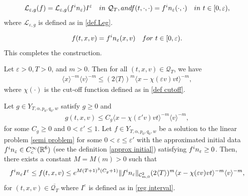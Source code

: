 \documentclass[10pt,a4paper]{amsart}
\begin{document}
\begin{align}\label{semi problem}
\mathcal{L}_{\varepsilon,g}(f) = \mathcal{L}_{\varepsilon,g}(f^\textup{in}_\varepsilon)I^\varepsilon \quad \textup{ in }\,\, \mathcal{Q}_T,\textup{ and }f(t,\cdot,\cdot) = f^\textup{in}_\varepsilon(\cdot,\cdot) \quad \textup{ in }\,\, t\in[0,\varepsilon),
\end{align} where $\mathcal{L}_{\varepsilon,g}$ is defined as in \eqref{def.Leg}.

\begin{equation}\label{f equals fin}
f(t,x,v) = f^\textup{in}_\varepsilon(x,v) \quad \textup{ for }\,\,t\in[0,\varepsilon).
\end{equation}This completes the construction.

\begin{lemma}\label{embed}Let $\varepsilon>0, T>0$, and $m>0$. Then for all $(t,x,v)\in\mathcal{Q}_T$, we have
\begin{align*}
 \langle x\rangle^{-m} \langle v\rangle^{-m}\le (2\langle T\rangle)^m \langle x-\chi(\varepsilon v)vt\rangle^{-m},
\end{align*}where $\chi(\cdot)$ is the cut-off function defined as in \eqref{def cutoff}.
\end{lemma}

\begin{lemma}\label{local comparison} Let $g \in Y_{T,\alpha,p_0,q_0,w}$ satisfy $g\ge0$ and
\begin{align*}
 g(t,x,v) \le C_g\langle x-\chi(\varepsilon' v)vt \rangle^{-m}\langle v\rangle^{-m},
\end{align*}for some $C_g\ge 0$ and $0<\varepsilon'\le 1$. Let $f\in Y_{T,\alpha,p_0,q_0,w}$ be a solution to the linear problem \eqref{semi problem} for some $0<\varepsilon\le \varepsilon'$ with the approximated initial data $f^\textup{in}_\varepsilon\in C^\infty_c(\mathbb{R}^6)$ (see the definition \eqref{approx initial}) satisfying $f^\textup{in}_\varepsilon\ge0$. Then, there exists a constant $M=M(m)>0$ such that
\begin{align*}
 f^\textup{in}_\varepsilon I^\varepsilon\le f(t,x,v) \le e^{M(T+1)^3(C_g+1)}\lVert f^\textup{in}_\varepsilon\rVert_{\mathcal{C}^2_{m,0}}(2\langle T\rangle)^m\langle x -\chi(\varepsilon v)vt\rangle^{-m} \langle v\rangle^{-m},
\end{align*} for $(t,x,v)\in\overline{\mathcal{Q}_T}$ where $I^\varepsilon$ is defined as in \eqref{reg interval}.
\end{lemma}
\end{document}
